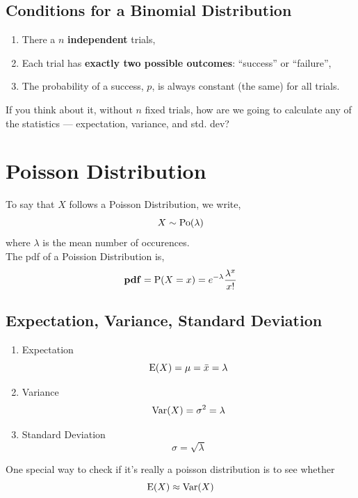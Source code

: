 \documentclass[../setup.tex]{subfiles}
\begin{document}
\subsection{Conditions for a Binomial Distribution}
\begin{enumerate}
	\item There a $n$ \textbf{independent} trials,
	\item Each trial has \textbf{exactly two possible outcomes}: ``success'' or ``failure'',
	\item The probability of a success, $p$, is always constant (the same) for all trials. 
\end{enumerate}
\begin{remark} If you think about it, without $n$ fixed trials, how are we going to calculate any of the statistics --- expectation, variance, and std. dev? 
\end{remark}

\section{Poisson Distribution}

\begin{theorem}
To say that $X$ follows a Poisson Distribution, we write,
\[ X \sim \textup{Po}(\lambda) \]
where $\lambda$ is the mean number of occurences. \\
The pdf of a Poission Distribution is,
\[ \text{\textbf{pdf}} = \textup{P}(X = x) = e^{-\lambda}\frac{\lambda^x}{x!} \]
\end{theorem}

\subsection{Expectation, Variance, Standard Deviation}
\begin{enumerate}
	\item Expectation \[ \textup{E}(X) = \mu = \bar{x} = \lambda \]
	\item Variance \[ \textup{Var}(X) = \sigma^2 = \lambda \]
	\item Standard Deviation \[ \sigma = \sqrt{\lambda} \]
\end{enumerate}

\begin{remark} One special way to check if it's really a poisson distribution is to see whether \[ \textup{E}(X) \approx \textup{Var}(X) \]
\end{remark}
\end{document}
